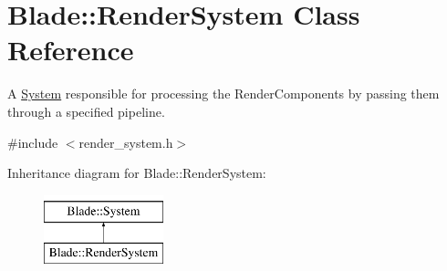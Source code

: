 \hypertarget{class_blade_1_1_render_system}{}\section{Blade\+:\+:Render\+System Class Reference}
\label{class_blade_1_1_render_system}


A \hyperlink{class_blade_1_1_system}{System} responsible for processing the Render\+Components by passing them through a specified pipeline.  




{\ttfamily \#include $<$render\+\_\+system.\+h$>$}

Inheritance diagram for Blade\+:\+:Render\+System\+:\begin{figure}[H]
\begin{center}
\leavevmode
\includegraphics[height=2.000000cm]{class_blade_1_1_render_system}
\end{center}
\end{figure}
